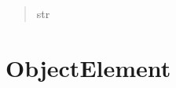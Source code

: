 \documentclass[letterpaper,10pt,english]{sphinxmanual}
\begin{document}
\begin{fulllineitems}
\begin{fulllineitems}
\begin{quote}
\begin{description}
\sphinxAtStartPar
str

\end{description}\end{quote}

\end{fulllineitems}


\end{fulllineitems}



\section{ObjectElement}
\label{\detokenize{code_documentation:objectelement}}
\end{document}
